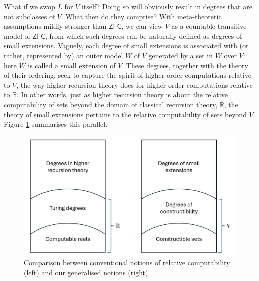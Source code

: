 \documentclass[12pt, twoside]{memoir}
\numberwithin{equation}{section}
\theoremstyle{definition}
\theoremstyle{remark}
\theoremstyle{definition}
\theoremstyle{definition}
\theoremstyle{definition}
\theoremstyle{remark}
\begin{document}
What if we swop $L$ for $V$ itself? Doing so will obviously result in degrees that are not subclasses of $V$. What then do they comprise? With meta-theoretic assumptions mildly stronger than $\mathsf{ZFC}$, we can view $V$ as a countable transitive model of $\mathsf{ZFC}$, from which such degrees can be naturally defined as degrees of small extensions. Vaguely, each degree of small extensions is associated with (or rather, represented by) an outer model $W$ of $V$ generated by a set in $W$ over $V$: here $W$ is called a small extension of $V$. These degrees, together with the theory of their ordering, seek to capture the spirit of higher-order computations relative to $V$, the way higher recursion theory does for higher-order computations relative to $\mathbb{R}$. In other words, just as higher recursion theory is about the relative computability of sets beyond the domain of classical recursion theory, $\mathbb{R}$, the theory of small extensions pertains to the relative computability of sets beyond $V$. Figure \ref{analogy} summarises this parallel.

\begin{figure}[!ht]
    \centering
    \includegraphics[width=\textwidth]{analogy.jpg}
    \captionsetup{width=0.8\textwidth, format=hang}
    \caption[Comparison between conventional and generalised notions of relative computability]{Comparison between conventional notions of relative computability (left) and our generalised notions (right).}
    \label{analogy}
\end{figure}
\end{document}
